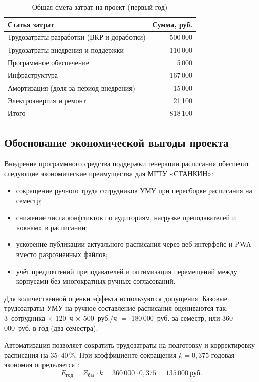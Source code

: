 \begin{table}[H]
	\centering
	\caption{Общая смета затрат на проект (первый год)}
	\label{tab:budget}
	\begin{tabularx}{\textwidth}{|>{\raggedright\arraybackslash}X|r|}
		\hline
		\textbf{Статья затрат} & \textbf{Сумма, руб.} \\
		\hline
		Трудозатраты разработки (ВКР и доработки) & 500\,000 \\
		\hline
		Трудозатраты внедрения и поддержки & 110\,000 \\
		\hline
		Программное обеспечение & 5\,000 \\
		\hline
		Инфраструктура & 167\,000 \\
		\hline
		Амортизация (доля за период внедрения) & 15\,000 \\
		\hline
		Электроэнергия и ремонт & 21\,100 \\
		\hline
		Итого & 818\,100 \\
		\hline
	\end{tabularx}
\end{table}

\subsection{Обоснование экономической выгоды проекта}

Внедрение программного средства поддержки генерации расписания обеспечит следующие экономические преимущества для МГТУ «СТАНКИН»:

\begin{itemize}
	\item сокращение ручного труда сотрудников УМУ при пересборке расписания на семестр;
	\item снижение числа конфликтов по аудиториям, нагрузке преподавателей и «окнам» в расписании;
	\item ускорение публикации актуального расписания через веб-интерфейс и PWA вместо разрозненных файлов;
	\item учёт предпочтений преподавателей и оптимизация перемещений между корпусами без многократных ручных согласований.
\end{itemize}

Для количественной оценки эффекта используются допущения. Базовые трудозатраты УМУ на ручное составление расписания оцениваются так: 3~сотрудника $\times$ 120~ч $\times$ 500~руб./ч $=$ 180\,000~руб. за семестр, или 360\,000~руб. в год (два семестра).

Автоматизация позволяет сократить трудозатраты на подготовку и корректировку расписания на 35--40\,\%. При коэффициенте сокращения $k = 0{,}375$ годовая экономия определяется :
\begin{equation}
	E_{\mathrm{год}} = Z_{\mathrm{баз}} \cdot k = 360\,000 \cdot 0{,}375 = 135\,000~\text{руб.}
	\label{eq:year-savings}
\end{equation}

